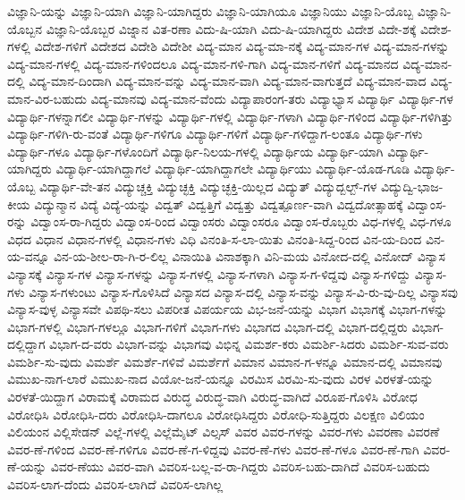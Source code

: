 {ವಿಜ್ಞಾನಿ-ಯನ್ನು
ವಿಜ್ಞಾನಿ-ಯಾಗಿ
ವಿಜ್ಞಾನಿ-ಯಾಗಿದ್ದರು
ವಿಜ್ಞಾನಿ-ಯಾಗಿಯೂ
ವಿಜ್ಞಾನಿಯು
ವಿಜ್ಞಾನಿ-ಯೊಬ್ಬ
ವಿಜ್ಞಾನಿ-ಯೊಬ್ಬನ
ವಿಜ್ಞಾನಿ-ಯೊಬ್ಬರ
ವಿಜ್ನಾನ
ವಿತ-ರಣಾ
ವಿದು-ಷಿ-ಯಾಗಿ
ವಿದು-ಷಿ-ಯಾಗಿದ್ದರು
ವಿದೇಶ
ವಿದೇ-ಶಕ್ಕೆ
ವಿದೇಶ-ಗಳಲ್ಲಿ
ವಿದೇಶ-ಗಳಿಗೆ
ವಿದೇಶದ
ವಿದೇಶಿ
ವಿದೇಶೀ
ವಿದ್ಯ-ಮಾನ
ವಿದ್ಯ-ಮಾ-ನಕ್ಕೆ
ವಿದ್ಯ-ಮಾನ-ಗಳ
ವಿದ್ಯ-ಮಾನ-ಗಳನ್ನು
ವಿದ್ಯ-ಮಾನ-ಗಳಲ್ಲಿ
ವಿದ್ಯ-ಮಾನ-ಗಳಿಂದಲೂ
ವಿದ್ಯ-ಮಾನ-ಗಳಿ-ಗಾಗಿ
ವಿದ್ಯ-ಮಾನ-ಗಳಿಗೆ
ವಿದ್ಯ-ಮಾನದ
ವಿದ್ಯ-ಮಾನ-ದಲ್ಲಿ
ವಿದ್ಯ-ಮಾನ-ದಿಂದಾಗಿ
ವಿದ್ಯ-ಮಾನ-ವನ್ನು
ವಿದ್ಯ-ಮಾನ-ವಾಗಿ
ವಿದ್ಯ-ಮಾನ-ವಾಗುತ್ತದೆ
ವಿದ್ಯ-ಮಾನ-ವಾದ
ವಿದ್ಯ-ಮಾನ-ವಿರ-ಬಹುದು
ವಿದ್ಯ-ಮಾನವು
ವಿದ್ಯ-ಮಾನ-ವೆಂದು
ವಿದ್ಯಾಪಾರಂಗ-ತರು
ವಿದ್ಯಾಭ್ಯಾಸ
ವಿದ್ಯಾರ್ಥಿ
ವಿದ್ಯಾರ್ಥಿ-ಗಳ
ವಿದ್ಯಾರ್ಥಿ-ಗಳನ್ನಾಗಲೀ
ವಿದ್ಯಾರ್ಥಿ-ಗಳನ್ನು
ವಿದ್ಯಾರ್ಥಿ-ಗಳಲ್ಲಿ
ವಿದ್ಯಾರ್ಥಿ-ಗಳಾಗಿ
ವಿದ್ಯಾರ್ಥಿ-ಗಳಿಂದ
ವಿದ್ಯಾರ್ಥಿ-ಗಳಿಗಿತ್ತು
ವಿದ್ಯಾರ್ಥಿ-ಗಳಿಗಿ-ರು-ವಂತೆ
ವಿದ್ಯಾರ್ಥಿ-ಗಳಿಗೂ
ವಿದ್ಯಾರ್ಥಿ-ಗಳಿಗೆ
ವಿದ್ಯಾರ್ಥಿ-ಗಳಿದ್ದಾಗ-ಲಂತೂ
ವಿದ್ಯಾರ್ಥಿ-ಗಳು
ವಿದ್ಯಾರ್ಥಿ-ಗಳೂ
ವಿದ್ಯಾರ್ಥಿ-ಗಳೊಂದಿಗೆ
ವಿದ್ಯಾರ್ಥಿ-ನಿಲಯ-ಗಳಲ್ಲಿ
ವಿದ್ಯಾರ್ಥಿಯ
ವಿದ್ಯಾರ್ಥಿ-ಯಾಗಿ
ವಿದ್ಯಾರ್ಥಿ-ಯಾಗಿದ್ದರು
ವಿದ್ಯಾರ್ಥಿ-ಯಾಗಿದ್ದಾಗಲೆ
ವಿದ್ಯಾರ್ಥಿ-ಯಾಗಿದ್ದಾಗಲೇ
ವಿದ್ಯಾರ್ಥಿಯು
ವಿದ್ಯಾರ್ಥಿ-ಯೊಡ-ಗೂಡಿ
ವಿದ್ಯಾರ್ಥಿ-ಯೊಬ್ಬ
ವಿದ್ಯಾರ್ಥಿ-ವೇ-ತನ
ವಿದ್ಯುಚ್ಚಕ್ತಿ
ವಿದ್ಯುಚ್ಛಕ್ತಿ
ವಿದ್ಯುಚ್ಛಕ್ತಿ-ಯಿಲ್ಲದ
ವಿದ್ಯುತ್
ವಿದ್ಯುದ್ಬಲ್ಬ್-ಗಳ
ವಿದ್ಯುದ್ವಿ-ಭಾಜ-ಕೀಯ
ವಿದ್ಯುನ್ಮಾನ
ವಿದ್ಯೆ
ವಿದ್ಯೆ-ಯನ್ನು
ವಿದ್ವತ್
ವಿದ್ವತ್ತಿಗೆ
ವಿದ್ವತ್ತು
ವಿದ್ವತ್ಪೂರ್ಣ-ವಾಗಿ
ವಿದ್ವದೋತ್ಸಾಹಕ್ಕೆ
ವಿದ್ವಾಂಸ-ರನ್ನು
ವಿದ್ವಾಂಸ-ರಾ-ಗಿದ್ದರು
ವಿದ್ವಾಂಸ-ರಿಂದ
ವಿದ್ವಾಂಸರು
ವಿದ್ವಾಂಸರೂ
ವಿದ್ವಾಂಸ-ರೊಬ್ಬರು
ವಿಧ-ಗಳಲ್ಲಿ
ವಿಧ-ಗಳೂ
ವಿಧದ
ವಿಧಾನ
ವಿಧಾನ-ಗಳಲ್ಲಿ
ವಿಧಾನ-ಗಳು
ವಿಧಿ
ವಿನಂತಿ-ಸ-ಲಾ-ಯಿತು
ವಿನಂತಿ-ಸಿದ್ದ-ರಿಂದ
ವಿನ-ಯ-ದಿಂದ
ವಿನ-ಯ-ವನ್ನೂ
ವಿನ-ಯ-ಶೀಲ-ರಾ-ಗಿ-ರ-ಲಿಲ್ಲ
ವಿನಾಯಿತಿ
ವಿನಾಶಕ್ಕಾಗಿ
ವಿನಿ-ಮಯ
ವಿನೋದ-ದಲ್ಲಿ
ವಿನೋದ್
ವಿನ್ಯಾಸ
ವಿನ್ಯಾಸಕ್ಕೆ
ವಿನ್ಯಾಸ-ಗಳ
ವಿನ್ಯಾಸ-ಗಳನ್ನು
ವಿನ್ಯಾಸ-ಗಳಲ್ಲಿ
ವಿನ್ಯಾಸ-ಗಳಾಗಿ
ವಿನ್ಯಾಸ-ಗ-ಳಿದ್ದವು
ವಿನ್ಯಾಸ-ಗಳಿದ್ದು
ವಿನ್ಯಾಸ-ಗಳು
ವಿನ್ಯಾಸ-ಗಳುಂಟು
ವಿನ್ಯಾಸ-ಗೊಳಿಸಿದೆ
ವಿನ್ಯಾಸದ
ವಿನ್ಯಾಸ-ದಲ್ಲಿ
ವಿನ್ಯಾಸ-ವನ್ನು
ವಿನ್ಯಾಸ-ವಿ-ರು-ವು-ದಿಲ್ಲ
ವಿನ್ಯಾಸವು
ವಿನ್ಯಾಸ-ವುಳ್ಳ
ವಿನ್ಯಾಸವೇ
ವಿಪಥಿ-ಸಲು
ವಿಪರೀತ
ವಿಪರ್ಯಯ
ವಿಭ-ಜನೆ-ಯನ್ನು
ವಿಭಾಗ
ವಿಭಾಗಕ್ಕೆ
ವಿಭಾಗ-ಗಳನ್ನು
ವಿಭಾಗ-ಗಳಲ್ಲಿ
ವಿಭಾಗ-ಗಳಲ್ಲೂ
ವಿಭಾಗ-ಗಳಿಗೆ
ವಿಭಾಗ-ಗಳು
ವಿಭಾಗದ
ವಿಭಾಗ-ದಲ್ಲಿ
ವಿಭಾಗ-ದಲ್ಲಿದ್ದರು
ವಿಭಾಗ-ದಲ್ಲಿದ್ದಾಗ
ವಿಭಾಗ-ದ-ವರು
ವಿಭಾಗ-ವನ್ನು
ವಿಭಾಗವು
ವಿಭಿನ್ನ
ವಿಮರ್ಶ-ಕರು
ವಿಮರ್ಶಿ-ಸಿದರು
ವಿಮರ್ಶಿ-ಸುವ-ವರು
ವಿಮರ್ಶಿ-ಸು-ವುದು
ವಿಮರ್ಶೆ
ವಿಮರ್ಶೆ-ಗಳಿವೆ
ವಿಮರ್ಶೆಗೆ
ವಿಮಾನ
ವಿಮಾನ-ಗ-ಳನ್ನೂ
ವಿಮಾನ-ದಲ್ಲಿ
ವಿಮಾನವು
ವಿಮುಖ-ನಾಗ-ಲಾರೆ
ವಿಮುಖ-ನಾದ
ವಿಯೋ-ಜನೆ-ಯನ್ನೂ
ವಿರಮಿಸ
ವಿರಮಿ-ಸು-ವುದು
ವಿರಳ
ವಿರಳತೆ-ಯನ್ನು
ವಿರಳತೆ-ಯಿದ್ದಾಗ
ವಿರಾಮಕ್ಕೆ
ವಿರಾಮದ
ವಿರುದ್ಧ
ವಿರುದ್ಧ-ವಾಗಿ
ವಿರುದ್ಧ-ವಾಗಿದೆ
ವಿರೂಪ-ಗೊಳಿಸಿ
ವಿರೋಧ
ವಿರೋಧಿಸಿ
ವಿರೋಧಿಸಿ-ದರು
ವಿರೋಧಿಸಿ-ದಾಗಲೂ
ವಿರೋಧಿಸಿದ್ದರು
ವಿರೋಧಿ-ಸುತ್ತಿದ್ದರು
ವಿಲಕ್ಷಣ
ವಿಲಿಯಂ
ವಿಲಿಯಂನ
ವಿಲ್ಲಿಸೇಡನ್
ವಿಲ್ಲೆ-ಗಳಲ್ಲಿ
ವಿಲ್ಲೆಮೈಟ್
ವಿಲ್ಸಸ್
ವಿವರ
ವಿವರ-ಗಳನ್ನು
ವಿವರ-ಗಳು
ವಿವರಣಾ
ವಿವರಣೆ
ವಿವರ-ಣೆ-ಗಳಿಂದ
ವಿವರ-ಣೆ-ಗಳಿಗೂ
ವಿವರ-ಣೆ-ಗ-ಳಿದ್ದವು
ವಿವರ-ಣೆ-ಗಳು
ವಿವರ-ಣೆ-ಗಳೂ
ವಿವರ-ಣೆ-ಗಾಗಿ
ವಿವರ-ಣೆ-ಯನ್ನು
ವಿವರ-ಣೆಯು
ವಿವರ-ವಾಗಿ
ವಿವರಿಸ-ಬಲ್ಲ-ವ-ರಾ-ಗಿದ್ದರು
ವಿವರಿಸ-ಬಹು-ದಾಗಿದೆ
ವಿವರಿಸ-ಬಹುದು
ವಿವರಿಸ-ಲಾಗ-ದೆಂದು
ವಿವರಿಸ-ಲಾಗಿದೆ
ವಿವರಿಸ-ಲಾಗಿಲ್ಲ
}
